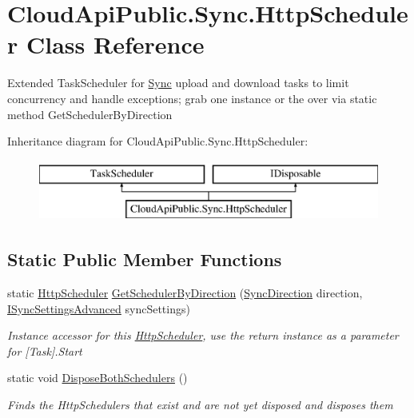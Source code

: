 \hypertarget{class_cloud_api_public_1_1_sync_1_1_http_scheduler}{\section{Cloud\-Api\-Public.\-Sync.\-Http\-Scheduler Class Reference}
\label{class_cloud_api_public_1_1_sync_1_1_http_scheduler}
}


Extended Task\-Scheduler for \hyperlink{namespace_cloud_api_public_1_1_sync}{Sync} upload and download tasks to limit concurrency and handle exceptions; grab one instance or the over via static method Get\-Scheduler\-By\-Direction  


Inheritance diagram for Cloud\-Api\-Public.\-Sync.\-Http\-Scheduler\-:\begin{figure}[H]
\begin{center}
\leavevmode
\includegraphics[height=2.000000cm]{class_cloud_api_public_1_1_sync_1_1_http_scheduler}
\end{center}
\end{figure}
\subsection*{Static Public Member Functions}
\begin{DoxyCompactItemize}
\item 
static \hyperlink{class_cloud_api_public_1_1_sync_1_1_http_scheduler}{Http\-Scheduler} \hyperlink{class_cloud_api_public_1_1_sync_1_1_http_scheduler_a38a2cbc4cc59a26e4d05f618f0f2c19d}{Get\-Scheduler\-By\-Direction} (\hyperlink{namespace_cloud_api_public_1_1_static_a8ba5d1f6d06fa058730616f021c8974f}{Sync\-Direction} direction, \hyperlink{interface_cloud_api_public_1_1_interfaces_1_1_i_sync_settings_advanced}{I\-Sync\-Settings\-Advanced} sync\-Settings)
\begin{DoxyCompactList}\small\item\em Instance accessor for this \hyperlink{class_cloud_api_public_1_1_sync_1_1_http_scheduler}{Http\-Scheduler}, use the return instance as a parameter for \mbox{[}Task\mbox{]}.Start \end{DoxyCompactList}\item 
static void \hyperlink{class_cloud_api_public_1_1_sync_1_1_http_scheduler_a5b654a57f79ca5b29982a697e017814e}{Dispose\-Both\-Schedulers} ()
\begin{DoxyCompactList}\small\item\em Finds the Http\-Schedulers that exist and are not yet disposed and disposes them \end{DoxyCompactList}\end{DoxyCompactItemize}

